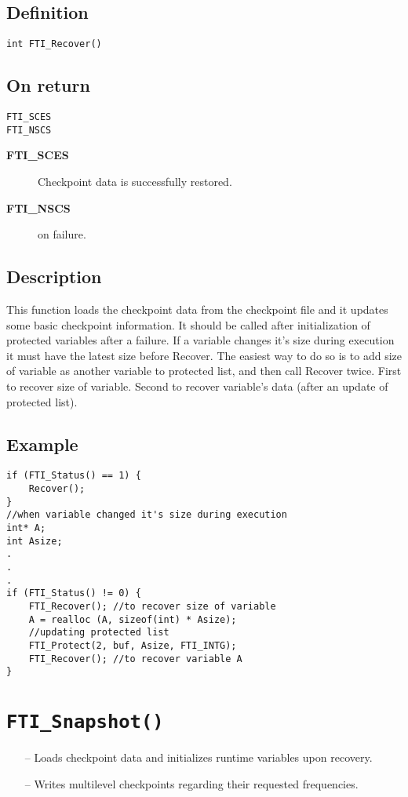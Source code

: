 \documentclass{refrep}
\begin{document}
\subsection*{Definition}
\begin{lstlisting}[frame=single]
int FTI_Recover()
\end{lstlisting}
\subsection*{On return}
\begin{lstlisting}[frame=single]
FTI_SCES
FTI_NSCS
\end{lstlisting}
\begin{description}
\item[\textbf{FTI\_SCES}] Checkpoint data is successfully restored.
\item[\textbf{FTI\_NSCS}] on failure.
\end{description}
\subsection*{Description}
This function loads the checkpoint data from the checkpoint file and it updates some basic checkpoint information. It should be called after initialization of protected variables after a failure. If a variable changes it's size during execution it must have the latest size before Recover. The easiest way to do so is to add size of variable as another variable to protected list, and then call Recover twice. First to recover size of variable. Second to recover variable's data (after an update of protected list).
\subsection*{Example}
\begin{center}
\begin{lstlisting}[frame=single]
if (FTI_Status() == 1) {
    Recover();
}
//when variable changed it's size during execution
int* A;
int Asize;
.
.
.
if (FTI_Status() != 0) {
    FTI_Recover(); //to recover size of variable
    A = realloc (A, sizeof(int) * Asize);
    //updating protected list
    FTI_Protect(2, buf, Asize, FTI_INTG);
    FTI_Recover(); //to recover variable A
}

\end{lstlisting}
\end{center}
\newpage
\section{\tt FTI\_Snapshot()}\label{sec:ftisnapshot}
\begin{framed}
\begin{itemize}
\item[--] Loads checkpoint data and initializes runtime variables upon recovery.
\item[--] Writes multilevel checkpoints regarding their requested frequencies.
\end{itemize}
\end{framed}
\end{document}
